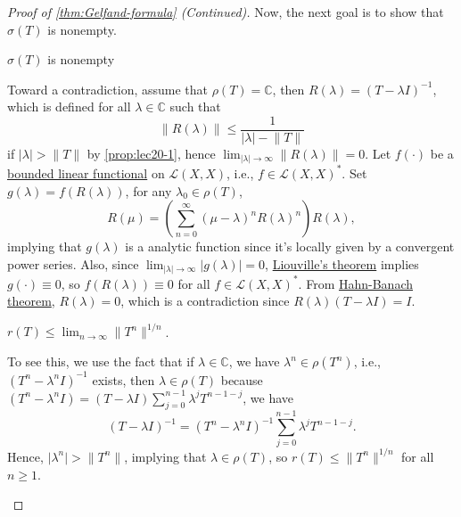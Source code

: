 \begin{proof}[Proof of \autoref{thm:Gelfand-formula} (Continued)]
	Now, the next goal is to show that \(\sigma (T)\) is nonempty.
	\begin{claim}
		\(\sigma (T)\) is nonempty
	\end{claim}
	\begin{explanation}
		Toward a contradiction, assume that \(\rho (T) = \mathbb{C} \), then \(R(\lambda ) = (T-\lambda I)^{-1} \), which is defined for all \(\lambda \in \mathbb{C} \) such that
		\[
			\lVert R(\lambda ) \rVert \leq \frac{1}{\vert \lambda  \vert - \lVert T \rVert }
		\]
		if \(\vert \lambda  \vert > \lVert T \rVert \) by \autoref{prop:lec20-1}, hence \(\lim_{\vert \lambda  \vert \to \infty} \lVert R(\lambda ) \rVert = 0\). Let \(f(\cdot)\) be a \hyperref[def:bounded-linear-functional]{bounded linear functional} on \(\mathcal{L} (X, X)\), i.e., \(f\in \mathcal{L} (X, X)^{\ast} \). Set \(g(\lambda ) = f(R(\lambda ))\), for any \(\lambda _0\in \rho (T)\),
		\[
			R(\mu ) = \left( \sum_{n=0}^{\infty} (\mu -\lambda )^n R(\lambda )^n  \right) R(\lambda ),
		\]
		implying that \(g(\lambda )\) is a analytic function since it's locally given by a convergent power series. Also, since \(\lim_{\vert \lambda \vert \to \infty} \vert g(\lambda ) \vert = 0\), \href{https://en.wikipedia.org/wiki/Liouville's_theorem_(complex_analysis)}{Liouville's theorem} implies \(g(\cdot) \equiv 0\), so \(f(R(\lambda ))\equiv 0\) for all \(f\in \mathcal{L} (X, X)^{\ast} \). From \hyperref[thm:Hahn-Banach]{Hahn-Banach theorem}, \(R(\lambda ) = 0\), which is a contradiction since \(R(\lambda )(T-\lambda I) = I\).
	\end{explanation}

	\begin{claim}
		\(r(T) \leq \lim_{n \to \infty} \lVert T^n \rVert ^{1 / n}\).
	\end{claim}
	\begin{explanation}
		To see this, we use the fact that if \(\lambda \in \mathbb{C} \), we have \(\lambda ^n \in \rho (T^n)\), i.e., \((T^n - \lambda ^n I)^{-1} \) exists, then \(\lambda \in \rho (T)\) because \((T^n - \lambda ^n I) = (T - \lambda I)\sum_{j=0}^{n-1} \lambda ^j T^{n-1-j}\), we have
		\[
			(T-\lambda I)^{-1} = (T^n - \lambda ^n I)^{-1} \sum_{j=0}^{n-1} \lambda ^j T^{n-1-j}.
		\]
		Hence, \(\vert \lambda ^n \vert > \lVert T^n \rVert \), implying that \(\lambda \in \rho (T)\), so \(r(T) \leq \lVert T^n \rVert ^{1 / n}\) for all \(n\geq 1\).
	\end{explanation}


\end{proof}
